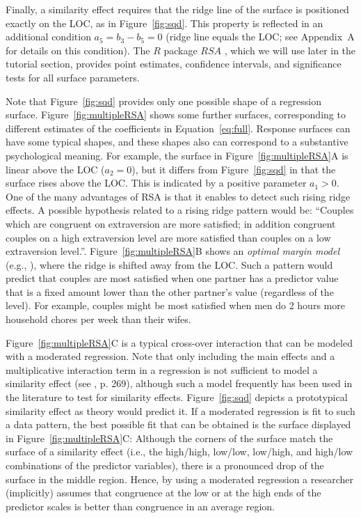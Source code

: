 \documentclass[jou,a4paper,draftfirst]{apa6}
\newcommand{\added}[1]{#1}
\begin{document}
Finally, a similarity effect requires that the ridge line of the surface is positioned exactly on the LOC, as in Figure~\ref{fig:sqd}. This property is reflected in an additional condition $a_5 = b_3 - b_5 = 0$ (ridge line equals the LOC; see Appendix~A for details on this condition). The $R$ package $RSA$ \parencite{schonbrodt_rsa:_2016}, which we will use later in the tutorial section, provides point estimates, confidence intervals, and significance tests for all surface parameters.

Note that Figure~\ref{fig:sqd} provides only one possible shape of a regression surface. Figure~\ref{fig:multipleRSA} shows some further surfaces, corresponding to different estimates of the coefficients in Equation~\ref{eq:full}. \added{Response surfaces can have some typical shapes, and these shapes also can correspond to a substantive psychological meaning. For example, the surface in Figure~\ref{fig:multipleRSA}A is linear above the LOC ($a_2=0$), but it differs from Figure~\ref{fig:sqd} in that the surface rises above the LOC. This is indicated by a positive parameter $a_1 > 0$. One of the many advantages of RSA is that it enables to detect such rising ridge effects. A possible hypothesis related to a rising ridge pattern would be: ``Couples which are congruent on extraversion are more satisfied; in addition congruent couples on a high extraversion level are more satisfied than couples on a low extraversion level.''. 
Figure~\ref{fig:multipleRSA}B shows an \textit{optimal margin model} (e.g., \nptextcite{Baumeister_1989}), where the ridge is shifted away from the LOC. Such a pattern would predict that couples are most satisfied when one partner has a predictor value that is a fixed amount lower than the other partner's value (regardless of the level). For example, couples might be most satisfied when men do 2 hours more household chores per week than their wifes.}

\added{Figure~\ref{fig:multipleRSA}C is a typical cross-over interaction that can be modeled with a moderated regression.
Note that only including the main effects and a multiplicative interaction term in a regression is not sufficient to model a similarity effect (see \nptextcite{Edwards2001}, p. 269), although such a model frequently has been used in the literature to test for similarity effects. Figure~\ref{fig:sqd} depicts a prototypical similarity effect as theory would predict it. If a moderated regression is fit to such a data pattern, the best possible fit that can be obtained is the surface displayed in Figure~\ref{fig:multipleRSA}C: Although the corners of the surface match the surface of a similarity effect (i.e., the high/high, low/low, low/high, and high/low combinations of the predictor variables), there is a pronounced drop of the surface in the middle region. Hence, by using a moderated regression a researcher (implicitly) assumes that congruence at the low or at the high ends of the predictor scales is better than congruence in an average region.}
\end{document}
